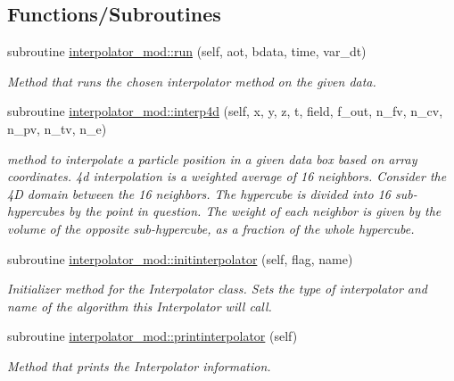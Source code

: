 \subsection*{Functions/\+Subroutines}
\begin{DoxyCompactItemize}
\item 
subroutine \mbox{\hyperlink{namespaceinterpolator__mod_ab4d61e34f8feebf8c75e988a6c7cac85}{interpolator\+\_\+mod\+::run}} (self, aot, bdata, time, var\+\_\+dt)
\begin{DoxyCompactList}\small\item\em Method that runs the chosen interpolator method on the given data. \end{DoxyCompactList}\item 
subroutine \mbox{\hyperlink{namespaceinterpolator__mod_a1bf15b6fa6e4fd0bb4a8e544994c487d}{interpolator\+\_\+mod\+::interp4d}} (self, x, y, z, t, field, f\+\_\+out, n\+\_\+fv, n\+\_\+cv, n\+\_\+pv, n\+\_\+tv, n\+\_\+e)
\begin{DoxyCompactList}\small\item\em method to interpolate a particle position in a given data box based on array coordinates. 4d interpolation is a weighted average of 16 neighbors. Consider the 4D domain between the 16 neighbors. The hypercube is divided into 16 sub-\/hypercubes by the point in question. The weight of each neighbor is given by the volume of the opposite sub-\/hypercube, as a fraction of the whole hypercube. \end{DoxyCompactList}\item 
subroutine \mbox{\hyperlink{namespaceinterpolator__mod_adcaf3bba800f19991ed4f33c968184e9}{interpolator\+\_\+mod\+::initinterpolator}} (self, flag, name)
\begin{DoxyCompactList}\small\item\em Initializer method for the Interpolator class. Sets the type of interpolator and name of the algorithm this Interpolator will call. \end{DoxyCompactList}\item 
subroutine \mbox{\hyperlink{namespaceinterpolator__mod_a9b149bc8a3da5d1864b8c049f8b00697}{interpolator\+\_\+mod\+::printinterpolator}} (self)
\begin{DoxyCompactList}\small\item\em Method that prints the Interpolator information. \end{DoxyCompactList}\end{DoxyCompactItemize}

